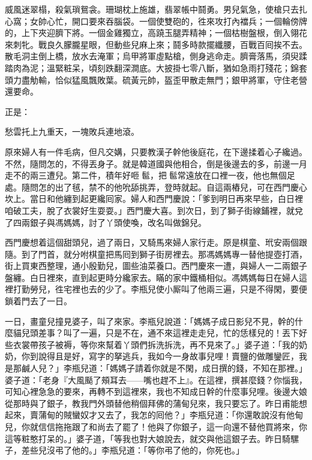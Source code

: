 威風迷翠榻，殺氣瑣鴛衾。珊瑚枕上施雄，翡翠帳中鬪勇。男兒氣急，使槍只去扎心窩；女帥心忙，開口要來吞腦袋。一個使雙砲的，徃來攻打內襠兵；一個輪傍牌的，上下夾迎臍下將。一個金雞獨立，高蹺玉腿弄精神；一個枯樹盤根，倒入翎花來刺牝。戰良久朦朧星眼，但動些兒麻上來；鬪多時款擺纖腰，百戰百囘挨不去。散毛洞主倒上橋，放水去淹軍；烏甲將軍虛點槍，側身逃命走。臍膏落馬，須臾蹂踏肉為泥；溫緊粧呆，頃刻跌翻深澗底。大披掛七零八斷，猶如急雨打殘花；錦套頭力盡觔輸，恰似猛風飄敗葉。硫黃元帥，盔歪甲散走無門；銀甲將軍，守住老營還要命。

正是：

愁雲托上九重天，一塊敗兵連地滾。

原來婦人有一件毛病，{}但凡交媾，只要教漢子幹他後庭花，在下邊揉着心子纔過。不然，隨問怎的，不得丟身子。就是韓道國與他相合，倒是後邊去的多，前邊一月走不的兩三遭兒。第二件，積年好咂𩫻䯲，把𩫻䯲常遠放在口裡一夜，他也無個足處。隨問怎的出了毧，禁不的他吮舔挑弄，登時就起。自這兩樁兒，可在西門慶心坎上。當日和他纏到起更纔囘家。婦人和西門慶說：「爹到明日再來早些，白日裡咱破工夫，脫了衣裳好生耍耍。」西門慶大喜。到次日，到了獅子街線鋪裡，就兌了四兩銀子與馮媽媽，討了丫頭使喚，改名叫做錦兒。

西門慶想着這個甜頭兒，過了兩日，又騎馬來婦人家行走。原是棋童、玳安兩個跟隨。到了門首，就分咐棋童把馬囘到獅子街房裡去。那馮媽媽專一替他提壺打酒，街上買東西整理，通小殷勤兒，圖些油菜養口。西門慶來一遭，與婦人一二兩銀子盤纏。白日裡來，直到起更時分纔家去。瞞的家中鐵桶相似。馮媽媽每日在婦人這裡打勤勞兒，徃宅裡也去的少了。李瓶兒使小厮叫了他兩三遍，只是不得閑，要便鎖着門去了一日。

一日，畫童兒撞見婆子，叫了來家。李瓶兒說道：「媽媽子成日影兒不見，幹的什麼貓兒頭差事？叫了一遍，只是不在，通不來這裡走走兒，忙的恁樣兒的！丟下好些衣裳帶孩子被褥，等你來幫着丫頭們拆洗拆洗，再不見來了。」婆子道：「我的奶奶，你到說得且是好，寫字的拏逃兵，我如今一身故事兒哩！賣鹽的做雕鑾匠，我是那鹹人兒？」{}李瓶兒道：「媽媽子請着你就是不閑，成日撰的錢，不知在那裡。」婆子道：「老身『大風颳了頰耳去——嘴也趕不上』。在這裡，撰甚麼錢？你惱我，可知心裡急急的要來，再轉不到這裡來，我也不知成日幹的什麼事兒哩。後邊大娘從那時與了銀子，教我門外頭替他稍個拜佛的蒲甸兒來，我只要忘了。昨日甫能想起來，賣蒲甸的賊蠻奴才又去了，我怎的囘他？」李瓶兒道：「你還敢說沒有他甸兒，你就信信拖拖跟了和尚去了罷了！他與了你銀子，這一向還不替他買將來，你這等粧憨打呆的。」婆子道，「等我也對大娘說去，就交與他這銀子去。昨日騎騾子，差些兒沒弔了他的。」李瓶兒道：「等你弔了他的，你死也。」

